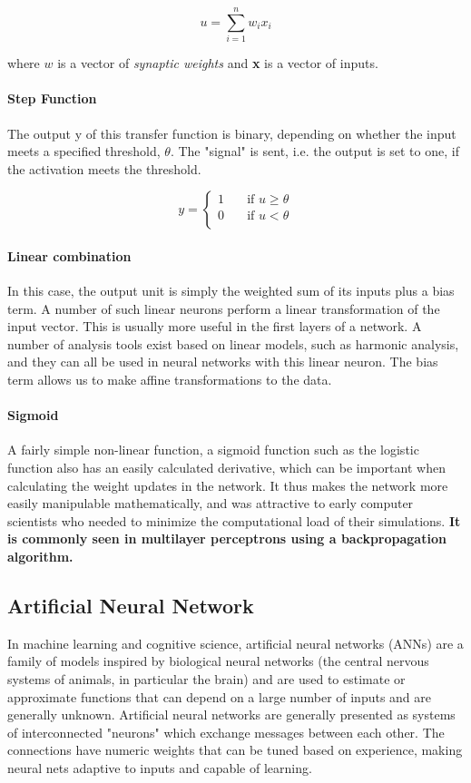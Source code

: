 \documentclass[14pt,a4paper]{extarticle}
\begin{document}
	\begin{equation}
		u = \sum_{i=1}^n w_{i}x_{i}
	\end{equation}
	
	where $w$ is a vector of \textit{synaptic weights} and \textbf{x} is a vector of inputs.
	
	\paragraph{Step Function}
	
	The output y of this transfer function is binary, depending on whether the input meets a specified threshold, $\theta$. The "signal" is sent, i.e. the output is set to one, if the activation meets the threshold.
	
	\[ y =
		\begin{cases}
		1 & \quad \text{if } u \geq \theta \\
		0 & \quad \text{if } u < \theta \\
		\end{cases}
	\]
	
	\paragraph{Linear combination}
	In this case, the output unit is simply the weighted sum of its inputs plus a bias term. A number of such linear neurons perform a linear transformation of the input vector. This is usually more useful in the first layers of a network. A number of analysis tools exist based on linear models, such as harmonic analysis, and they can all be used in neural networks with this linear neuron. The bias term allows us to make affine transformations to the data.
	
	\paragraph{Sigmoid}
	A fairly simple non-linear function, a sigmoid function such as the logistic function also has an easily calculated derivative, which can be important when calculating the weight updates in the network. It thus makes the network more easily manipulable mathematically, and was attractive to early computer scientists who needed to minimize the computational load of their simulations.  \textbf{It is commonly seen in multilayer perceptrons using a backpropagation algorithm.}
	
	
	\subsection{Artificial Neural Network}
	In machine learning and cognitive science, artificial neural networks (ANNs) are a family of models inspired by biological neural networks (the central nervous systems of animals, in particular the brain) and are used to estimate or approximate functions that can depend on a large number of inputs and are generally unknown. Artificial neural networks are generally presented as systems of interconnected "neurons" which exchange messages between each other. The connections have numeric weights that can be tuned based on experience, making neural nets adaptive to inputs and capable of learning.
\end{document}
